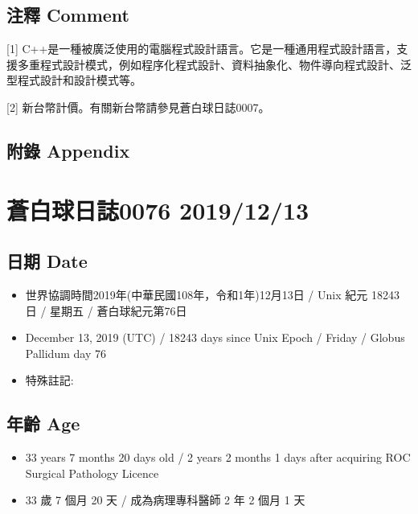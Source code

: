 \documentclass[a5paper, 12pt
]{book}
\providecommand{\tightlist}{%
  \setlength{\itemsep}{0pt}\setlength{\parskip}{0pt}}
\begin{document}
\hypertarget{ux6ce8ux91cb-comment-10}{%
\subsection{注釋 Comment}\label{ux6ce8ux91cb-comment-10}}

{[}1{]}
C++是一種被廣泛使用的電腦程式設計語言。它是一種通用程式設計語言，支援多重程式設計模式，例如程序化程式設計、資料抽象化、物件導向程式設計、泛型程式設計和設計模式等。

{[}2{]} 新台幣計價。有關新台幣請參見蒼白球日誌0007。

\hypertarget{ux9644ux9304-appendix-11}{%
\subsection{附錄 Appendix}\label{ux9644ux9304-appendix-11}}

\hypertarget{ux84bcux767dux7403ux65e5ux8a8c0076-20191213}{%
\section{蒼白球日誌0076
2019/12/13}\label{ux84bcux767dux7403ux65e5ux8a8c0076-20191213}}

\hypertarget{ux65e5ux671f-date-12}{%
\subsection{日期 Date}\label{ux65e5ux671f-date-12}}

\begin{itemize}
\tightlist
\item
  世界協調時間2019年(中華民國108年，令和1年)12月13日 / Unix 紀元 18243
  日 / 星期五 / 蒼白球紀元第76日
\item
  December 13, 2019 (UTC) / 18243 days since Unix Epoch / Friday /
  Globus Pallidum day 76
\item
  特殊註記:
\end{itemize}

\hypertarget{ux5e74ux9f61-age-12}{%
\subsection{年齡 Age}\label{ux5e74ux9f61-age-12}}

\begin{itemize}
\tightlist
\item
  33 years 7 months 20 days old / 2 years 2 months 1 days after
  acquiring ROC Surgical Pathology Licence
\item
  33 歲 7 個月 20 天 / 成為病理專科醫師 2 年 2 個月 1 天
\end{itemize}
\end{document}
